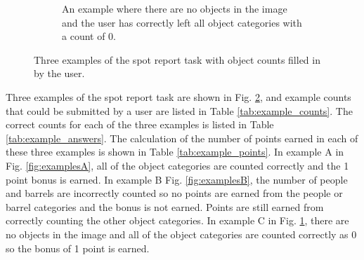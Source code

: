 \documentclass[preprint,12pt, a4paper]{elsarticle}
\begin{document}
\begin{figure}[!h]
\begin{subfigure}{0.71\linewidth}
            \caption{An example where there are no objects in the image and the user has correctly left all object categories with a count of 0.}
            \label{fig:examplesC}
        \end{subfigure}
        \caption{\label{fig:examples} Three examples of the spot report task with object counts filled in by the user.}
\end{figure}
   

Three examples of the spot report task are shown in Fig. \ref{fig:examples}, and example counts that could be submitted by a user are listed in Table \ref{tab:example_counts}. The correct counts for each of the three examples is listed in Table \ref{tab:example_answers}. The calculation of the number of points earned in each of these three examples is shown in Table \ref{tab:example_points}. In example A in Fig. \ref{fig:examplesA}, all of the object categories are counted correctly and the 1 point bonus is earned. In example B Fig. \ref{fig:examplesB}, the number of people and barrels are incorrectly counted so no points are earned from the people or barrel categories and the bonus is not earned. Points are still earned from correctly counting the other object categories. In example C in Fig. \ref{fig:examplesC}, there are no objects in the image and all of the object categories are counted correctly as 0 so the bonus of 1 point is earned.

\end{document}
